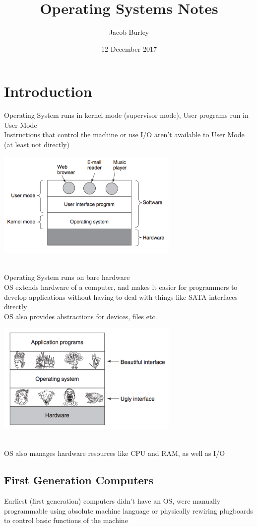 \documentclass{article}
\title{Operating Systems Notes}
\author{Jacob Burley} %
\date{12 December 2017}
\begin{document}
\maketitle
\section{Introduction}
Operating System runs in kernel mode (supervisor mode), User programs run in User Mode
\\Instructions that control the machine or use I/O aren't available to User Mode (at least not directly)
\begin{center}
\includegraphics[width= 250pt]{tex/ch1/1-1.png}
\end{center}
\\Operating System runs on bare hardware
\\OS extends hardware of a computer, and makes it easier for programmers to develop applications without having to deal with things like SATA interfaces directly
\\OS also provides abstractions for devices, files etc.
\begin{center}
\includegraphics[width = 250pt]{tex/ch1/1-2.png}
\end{center}
\\OS also manages hardware resources like CPU and RAM, as well as I/O
\subsection*{First Generation Computers}
Earliest (first generation) computers didn't have an OS, were manually programmable using absolute machine language or physically rewiring plugboards to control basic functions of the machine
\end{document}
